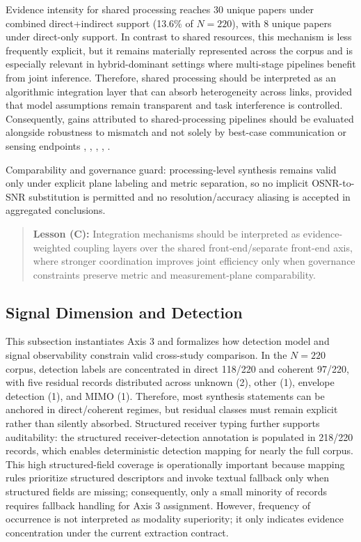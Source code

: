 Evidence intensity for shared processing reaches 30 unique papers under combined direct+indirect support (13.6\% of $N=220$), with 8 unique papers under direct-only support. In contrast to shared resources, this mechanism is less frequently explicit, but it remains materially represented across the corpus and is especially relevant in hybrid-dominant settings where multi-stage pipelines benefit from joint inference. Therefore, shared processing should be interpreted as an algorithmic integration layer that can absorb heterogeneity across links, provided that model assumptions remain transparent and task interference is controlled. Consequently, gains attributed to shared-processing pipelines should be evaluated alongside robustness to mismatch and not solely by best-case communication or sensing endpoints \cite{O_ISAC_086}, \cite{O_ISAC_166}, \cite{O_ISAC_134}, \cite{O_ISAC_381}, \cite{O_ISAC_161}.

Comparability and governance guard: processing-level synthesis remains valid only under explicit plane labeling and metric separation, so no implicit OSNR-to-SNR substitution is permitted and no resolution/accuracy aliasing is accepted in aggregated conclusions.

\begin{quote}
\textbf{Lesson (C):} Integration mechanisms should be interpreted as evidence-weighted coupling layers over the shared front-end/separate front-end axis, where stronger coordination improves joint efficiency only when governance constraints preserve metric and measurement-plane comparability.
\end{quote}

\subsection{Signal Dimension and Detection}
This subsection instantiates Axis 3 and formalizes how detection model and signal observability constrain valid cross-study comparison. In the $N=220$ corpus, detection labels are concentrated in direct 118/220 and coherent 97/220, with five residual records distributed across unknown (2), other (1), envelope detection (1), and MIMO (1). Therefore, most synthesis statements can be anchored in direct/coherent regimes, but residual classes must remain explicit rather than silently absorbed. Structured receiver typing further supports auditability: the structured receiver-detection annotation is populated in 218/220 records, which enables deterministic detection mapping for nearly the full corpus. This high structured-field coverage is operationally important because mapping rules prioritize structured descriptors and invoke textual fallback only when structured fields are missing; consequently, only a small minority of records requires fallback handling for Axis 3 assignment. However, frequency of occurrence is not interpreted as modality superiority; it only indicates evidence concentration under the current extraction contract.

